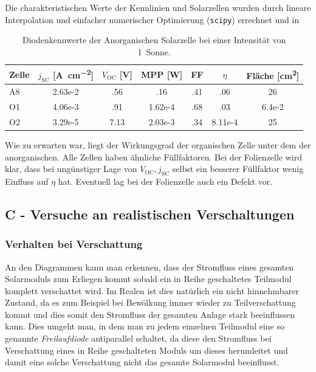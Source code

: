 \documentclass[slug=SZ, room=Hermann-Krone-Bau\,\ Labor\ 1.25, supervisor=Martin\ Kroll]{../../Lab_Report_LaTeX/lab_report}
\newcommand{\sun}[1]{\SI{#1}{Sonne}}
\newcommand{\voc}{V_{\text{OC}}}
\newcommand{\jsc}{j_{\text{SC}}}
\begin{document}
Die charakteristischen Werte der Kennlinien und Solarzellen wurden
durch lineare Interpolation und einfacher numerischer Optimierung
(\verb|scipy|) errechnet und in

\begin{table}[h]
  \centering
  \begin{tabular}{l|SSSSSS}
    \toprule
    Zelle & {\(\jsc\) [\si{A\per\centi\meter^2}]} & {\(\voc\) [\si{\volt}]} & {MPP
                                                            [\si{\watt}]}
    & {FF} & {\(\eta\)} & {Fl\"ache [\si{\centi\meter^2}]}\\
    \midrule
    A8 & 2.63e-2 & .56 & .16 & .41 & .06 & 26 \\
    O1 & 4.06e-3 & .91 & 1.62e-4 & .68 & .03 & 6.4e-2\\
    O2 & 3.29e-5 & 7.13 & 2.03e-3 & .34 & 8.11e-4 & 25 \\
  \end{tabular}
  \caption{Diodenkennwerte der Anorganischen Solarzelle bei einer
    Intensit\"at von \sun{1}.}
  \label{tab:diodano}
\end{table}

Wie zu erwarten war, liegt der Wirkungsgrad der organischen Zelle
unter dem der anorganischen. Alle Zellen haben \"ahnliche
F\"ullfaktoren.
Bei der Folienzelle wird klar, dass bei ung\"unstiger Lage von
\(\voc,\jsc\) selbst ein besserer F\"ullfaktor wenig Einfluss auf
\(\eta\) hat. Eventuell lag bei der Folienzelle auch ein Defekt vor.

\subsection{C - Versuche an realistischen Verschaltungen}
\label{sec:c}

\subsubsection{Verhalten bei Verschattung}
\label{sec:verschattung}

An den Diagrammen kann man erkennen, dass der Stromfluss eines gesamten Solarmoduls 
zum Erliegen kommt sobald ein in Reihe geschaltetes Teilmodul komplett verschattet wird.
Im Realen ist dies natürlich ein nicht hinnehmbarer Zustand, da es zum Beispiel bei
Bewölkung immer wieder zu Teilverschattung kommt und dies somit den Stromfluss der gesamten
Anlage stark beeinflussen kann.
Dies umgeht man, in dem man zu jedem einzelnen Teilmodul eine so genannte \emph{Freilaufdiode}
antiparallel schaltet, da diese den Stromfluss bei Verschattung eines in Reihe geschalteten 
Moduls um dieses herumleitet und damit eine solche Verschattung nicht das gesamte
Solarmodul beeinflusst.
\end{document}
